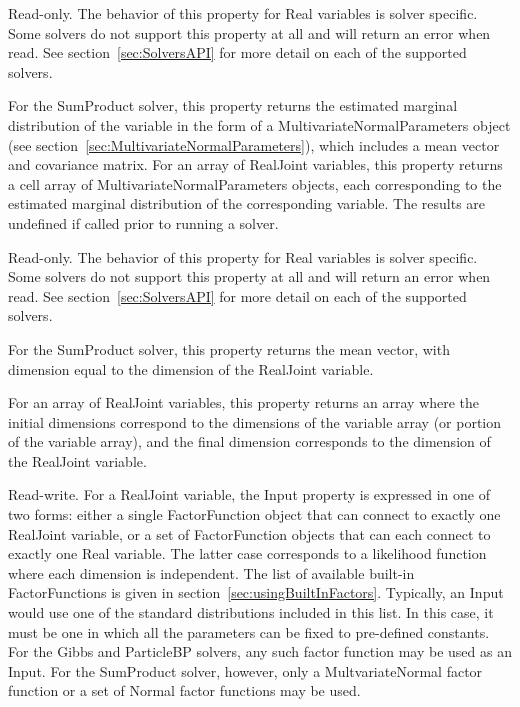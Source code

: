 Read-only.  The behavior of this property for Real variables is solver specific.  Some solvers do not support this property at all and will return an error when read.  See section~\ref{sec:SolversAPI} for more detail on each of the supported solvers.

For the SumProduct solver, this property returns the estimated marginal distribution of the variable in the form of a MultivariateNormalParameters object (see section~\ref{sec:MultivariateNormalParameters}), which includes a mean vector and covariance matrix.  \ifmatlab For an array of RealJoint variables, this property returns a cell array of MultivariateNormalParameters objects, each corresponding to the estimated marginal distribution of the corresponding variable. \fi The results are undefined if called prior to running a solver.

\label{sec:RealJoint.Value}

Read-only.  The behavior of this property for Real variables is solver specific.  Some solvers do not support this property at all and will return an error when read.  See section~\ref{sec:SolversAPI} for more detail on each of the supported solvers.

For the SumProduct solver, this property returns the mean vector, with dimension equal to the dimension of the RealJoint variable.

\ifmatlab
For an array of RealJoint variables, this property returns an array where the initial dimensions correspond to the dimensions of the variable array (or portion of the variable array), and the final dimension corresponds to the dimension of the RealJoint variable.
\fi

\label{sec:RealJoint.Input}

Read-write.  For a RealJoint variable, the Input property is expressed in one of two forms: either a single FactorFunction object that can connect to exactly one RealJoint variable, or a set of FactorFunction objects that can each connect to exactly one Real variable.  The latter case corresponds to a likelihood function where each dimension is independent.  The list of available built-in FactorFunctions is given in section~\ref{sec:usingBuiltInFactors}.  Typically, an Input would use one of the standard distributions included in this list.  In this case, it must be one in which all the parameters can be fixed to pre-defined constants.  For the Gibbs and ParticleBP solvers, any such factor function may be used as an Input.  For the SumProduct solver, however, only a MultvariateNormal factor function or a set of Normal factor functions may be used.

